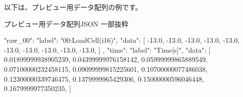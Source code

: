 以下は、プレビュー用データ配列の例です。
\begin{tcbcodeblock}{プレビュー用データ配列JSON 一部抜粋}
\begin{lstcodeblock}[]
{
    "raw_00": {
        "label": "00:LoadCell(i16)",
        "data": [
            -13.0,
            -13.0,
            -13.0,
            -13.0,
            -13.0,
            -13.0,
            -13.0,
            -13.0,
            -13.0,
            -13.0,
        ]
    },
    "time": {
        "label": "Time[s]",
        "data": [
            0.01899999938905239,
            0.04399999976158142,
            0.05999999865889549,
            0.07100000232458115,
            0.09099999815225601,
            0.10700000077486038,
            0.12300000339746475,
            0.1379999965429306,
            0.15000000596046448,
            0.1679999977350235,
        ]
    }
}
\end{lstcodeblock}
\end{tcbcodeblock}

